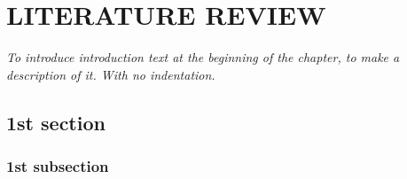 
\chapter{LITERATURE REVIEW} %
\label{Literature_review}

\vspace*{3\baselineskip} %

\noindent \textit{To introduce introduction text at the beginning of the chapter, to make a description of it. With no indentation.}

\section{1st section}

\blindtext

\subsection{1st subsection}

